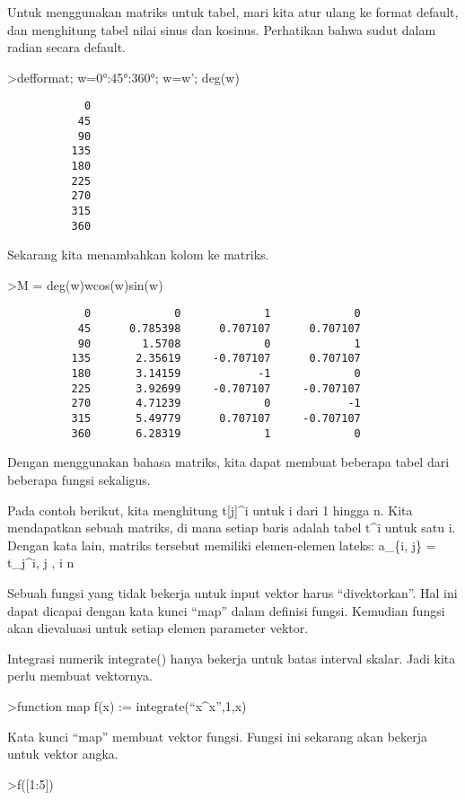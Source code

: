 \documentclass[
]{book}
\begin{document}
Untuk menggunakan matriks untuk tabel, mari kita atur ulang ke format default, dan menghitung tabel nilai sinus dan kosinus. Perhatikan bahwa sudut dalam radian secara default.

\textgreater defformat; w=0°:45°:360°; w=w'; deg(w)

\begin{verbatim}
            0 
           45 
           90 
          135 
          180 
          225 
          270 
          315 
          360 
\end{verbatim}

Sekarang kita menambahkan kolom ke matriks.

\textgreater M = deg(w)\textbar w\textbar cos(w)\textbar sin(w)

\begin{verbatim}
            0             0             1             0 
           45      0.785398      0.707107      0.707107 
           90        1.5708             0             1 
          135       2.35619     -0.707107      0.707107 
          180       3.14159            -1             0 
          225       3.92699     -0.707107     -0.707107 
          270       4.71239             0            -1 
          315       5.49779      0.707107     -0.707107 
          360       6.28319             1             0 
\end{verbatim}

Dengan menggunakan bahasa matriks, kita dapat membuat beberapa tabel dari beberapa fungsi sekaligus.

Pada contoh berikut, kita menghitung t{[}j{]}\^{}i untuk i dari 1 hingga n. Kita mendapatkan sebuah matriks, di mana setiap baris adalah tabel t\^{}i untuk satu i. Dengan kata lain, matriks tersebut memiliki elemen-elemen lateks: a\_\{i, j\} = t\_j\^{}i,  \le j ,  \le i \le n

Sebuah fungsi yang tidak bekerja untuk input vektor harus ``divektorkan''. Hal ini dapat dicapai dengan kata kunci ``map'' dalam definisi fungsi. Kemudian fungsi akan dievaluasi untuk setiap elemen parameter vektor.

Integrasi numerik integrate() hanya bekerja untuk batas interval skalar. Jadi kita perlu membuat vektornya.

\textgreater function map f(x) := integrate(``x\^{}x'',1,x)

Kata kunci ``map'' membuat vektor fungsi. Fungsi ini sekarang akan bekerja untuk vektor angka.

\textgreater f({[}1:5{]})
\end{document}
